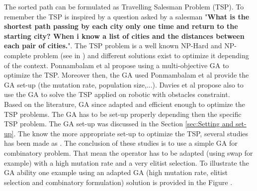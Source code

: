 The sorted path can be formulated as Travelling Salesman Problem (TSP). To remember the TSP is inspired by a question asked by a salesman "\textbf{What is the shortest path passing by each city only one time and return to the starting city? When i know a list of cities and the distances between each pair of cities.}". The TSP problem is a well known NP-Hard and NP-complete problem (see in \citep{236*karp1972}) and different solutions exist to optimize it depending of the context. 
Ponnambalam et al  \cite{172*ponnambalam2004} propose using a multi-objective GA to optimize the TSP. Moreover then, the GA used Ponmambalam et al  \cite{172*ponnambalam2004} provide the GA set-up (the mutation rate, population size,...). Davies et al \cite{56*davies2006} propose also to use the GA to solve the TSP applied on robotic with obstacles constraint. \\
Based on the literature, GA since adapted and efficient enough to optimize the TSP problems.
The GA has to be set-up properly depending then the specific TSP problem. The GA set-up was discussed in the Section \ref{sec:Setting and set-up}. The know the more appropriate set-up to optimize the TSP, several studies has been made  as \citep{68*muhlenbein1989,80*serpell2010,139*razali2011}. The conclusion of these studies is to use a simple GA for combinatory problem. That mean the operator has to be adapted (using swap for example) with a high mutation rate and a very elitist selection.
To illustrate the GA ability one example using an adapted GA (high mutation rate,  elitist selection and combinatory formulation) solution is provided in the Figure .




